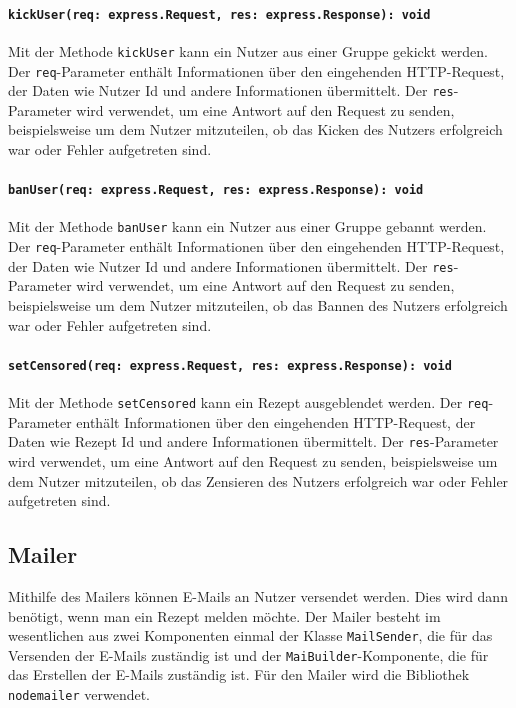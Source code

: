 \documentclass{entwurfsheft}
\begin{document}
\paragraph{\texttt{kickUser(req: express.Request, res: express.Response): void}}
Mit der Methode \texttt{kickUser} kann ein Nutzer aus einer Gruppe gekickt werden. Der \texttt{req}-Parameter enthält Informationen über den eingehenden HTTP-Request, der Daten wie Nutzer Id und andere Informationen übermittelt. Der \texttt{res}-Parameter wird verwendet, um eine Antwort auf den Request zu senden, beispielsweise um dem Nutzer mitzuteilen, ob das Kicken des Nutzers erfolgreich war oder Fehler aufgetreten sind.
\paragraph{\texttt{banUser(req: express.Request, res: express.Response): void}}
Mit der Methode \texttt{banUser} kann ein Nutzer aus einer Gruppe gebannt werden. Der \texttt{req}-Parameter enthält Informationen über den eingehenden HTTP-Request, der Daten wie Nutzer Id und andere Informationen übermittelt. Der \texttt{res}-Parameter wird verwendet, um eine Antwort auf den Request zu senden, beispielsweise um dem Nutzer mitzuteilen, ob das Bannen des Nutzers erfolgreich war oder Fehler aufgetreten sind.
\paragraph{\texttt{setCensored(req: express.Request, res: express.Response): void}}
Mit der Methode \texttt{setCensored} kann ein Rezept ausgeblendet werden. Der \texttt{req}-Parameter enthält Informationen über den eingehenden HTTP-Request, der Daten wie Rezept Id und andere Informationen übermittelt. Der \texttt{res}-Parameter wird verwendet, um eine Antwort auf den Request zu senden, beispielsweise um dem Nutzer mitzuteilen, ob das Zensieren des Nutzers erfolgreich war oder Fehler aufgetreten sind.

\subsection{Mailer}
Mithilfe des Mailers können E-Mails an Nutzer versendet werden. Dies wird dann benötigt, wenn man ein Rezept melden möchte.
Der Mailer besteht im wesentlichen aus zwei Komponenten einmal der Klasse \texttt{MailSender}, die für das Versenden der E-Mails zuständig ist und der \texttt{MaiBuilder}-Komponente, die für das Erstellen der E-Mails zuständig ist.
Für den Mailer wird die Bibliothek \texttt{nodemailer} verwendet.
\end{document}
